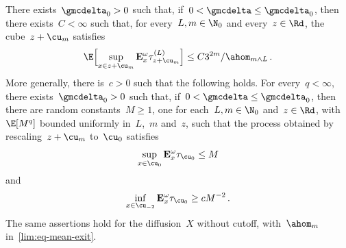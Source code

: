 \documentclass[11pt]{amsart}
\begin{document}
\begin{lemma}
\label{lim:lem-mean-exit}
There exists~$\gmcdelta_0>0$ such that, if~$0<\gmcdelta\leq\gmcdelta_0$, then there exists~$C<\infty$ such that, for every~$L,m\in\N_0$ and every~$z\in\Rd$, the cube~$z+\cu_m$ satisfies
\begin{equation}
	\E\Bigl[\sup_{x\in z+\cu_m}\mathbf E_x^\omega\tau_{z+\cu_m}^{(L)}\Bigr]
	\leq C3^{2m}/\ahom_{m\wedge L}\,.
	\label{lim:eq-mean-exit}
\end{equation}
More generally, there is~$c>0$ such that the following holds. For every~$q<\infty$, there exists~$\gmcdelta_0>0$ such that, if~$0<\gmcdelta\leq\gmcdelta_0$, then there are random constants~$M\geq1$, one for each~$L,m\in\N_0$ and~$z\in\Rd$, with~$\E[M^q]$ bounded uniformly in~$L$,~$m$ and~$z$, such that the process obtained by rescaling~$z+\cu_m$ to~$\cu_0$ satisfies
\begin{equation*}
	\sup_{x\in\cu_0}\mathbf E_x^\omega\tau_{\cu_0}\leq M
\end{equation*}
and
\begin{equation*}
	\inf_{x\in\cu_{-2}}\mathbf E_x^\omega\tau_{\cu_0}\geq cM^{-2}\,.
\end{equation*}
The same assertions hold for the diffusion~$X$ without cutoff, with~$\ahom_m$ in~\eqref{lim:eq-mean-exit}.
\end{lemma}
\end{document}
